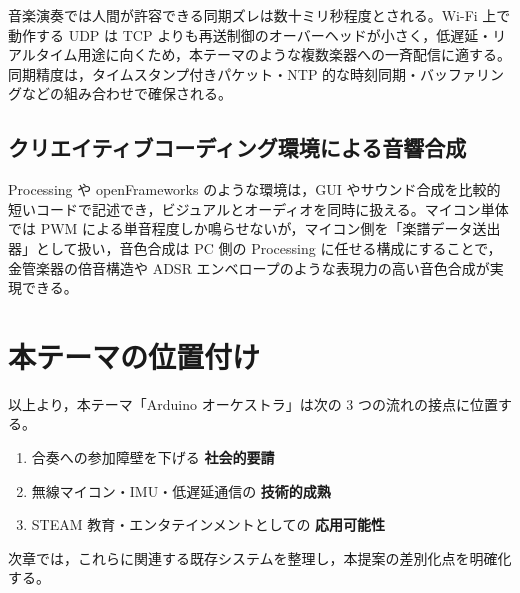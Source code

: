 音楽演奏では人間が許容できる同期ズレは数十ミリ秒程度とされる\cite{music_latency}。Wi-Fi 上で動作する UDP は TCP よりも再送制御のオーバーヘッドが小さく，低遅延・リアルタイム用途に向くため，本テーマのような複数楽器への一斉配信に適する\cite{udp_realtime}。同期精度は，タイムスタンプ付きパケット・NTP 的な時刻同期・バッファリングなどの組み合わせで確保される。

\subsection{クリエイティブコーディング環境による音響合成}

Processing や openFrameworks のような環境は，GUI やサウンド合成を比較的短いコードで記述でき，ビジュアルとオーディオを同時に扱える\cite{processing_sound}。マイコン単体では PWM による単音程度しか鳴らせないが，マイコン側を「楽譜データ送出器」として扱い，音色合成は PC 側の Processing に任せる構成にすることで，金管楽器の倍音構造や ADSR エンベロープのような表現力の高い音色合成が実現できる。

\section{本テーマの位置付け}
\label{sec:positioning}

以上より，本テーマ「Arduino オーケストラ」は次の 3 つの流れの接点に位置する。

\begin{enumerate}
  \item 合奏への参加障壁を下げる \textbf{社会的要請}
  \item 無線マイコン・IMU・低遅延通信の \textbf{技術的成熟}
  \item STEAM 教育・エンタテインメントとしての \textbf{応用可能性}
\end{enumerate}

次章では，これらに関連する既存システムを整理し，本提案の差別化点を明確化する。
